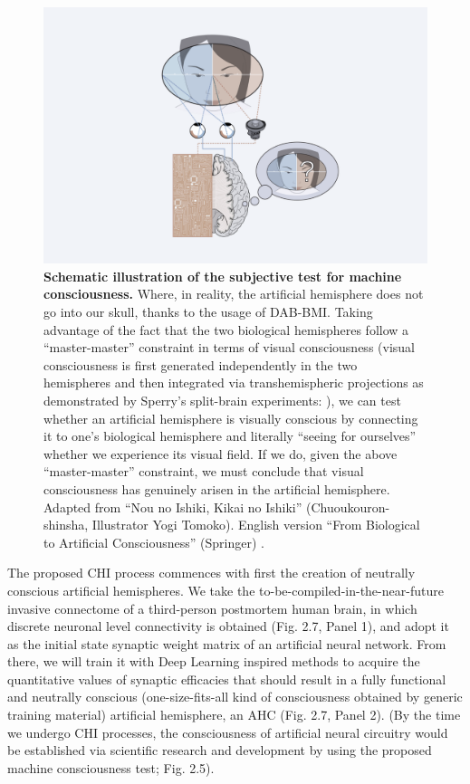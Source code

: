 \documentclass[10pt]{article}
\begin{document}
\begin{sloppypar}
  \begin{figure}[ht!]
    \centering
    \includegraphics[width=\textwidth]{figures/masa-approach-2.png}
    \caption[CHI: Schematic illustration of the subjective test for machine consciousness]{\textbf{Schematic illustration of the subjective test for machine consciousness.} Where, in reality, the artificial hemisphere does not go into our skull, thanks to the usage of DAB-BMI. Taking advantage of the fact that the two biological hemispheres follow a “master-master” constraint in terms of visual consciousness (visual consciousness is first generated independently in the two hemispheres and then integrated via transhemispheric projections as demonstrated by Sperry’s split-brain experiments: \cite{gazzaniga_functional_1962}), we can test whether an artificial hemisphere is visually conscious by connecting it to one’s biological hemisphere and literally “seeing for ourselves” whether we experience its visual field. If we do, given the above “master-master” constraint, we must conclude that visual consciousness has genuinely arisen in the artificial hemisphere. Adapted from “Nou no Ishiki, Kikai no Ishiki” (Chuoukouron-shinsha, Illustrator Yogi Tomoko). English version “From Biological to Artificial Consciousness” (Springer) \citep{watanabe_biological_2022}.}
    \label{fig:masa-approach-2}
  \end{figure}

  The proposed CHI process commences with first the creation of neutrally conscious artificial hemispheres. We take the to-be-compiled-in-the-near-future invasive connectome of a third-person postmortem human brain, in which discrete neuronal level connectivity is obtained (Fig. 2.7, Panel 1), and adopt it as the initial state synaptic weight matrix of an artificial neural network. From there, we will train it with Deep Learning inspired methods to acquire the quantitative values of synaptic efficacies that should result in a fully functional and neutrally conscious (one-size-fits-all kind of consciousness obtained by generic training material) artificial hemisphere, an AHC (Fig. 2.7, Panel 2). (By the time we undergo CHI processes, the consciousness of artificial neural circuitry would be established via scientific research and development by using the proposed machine consciousness test; Fig. 2.5).


\end{sloppypar}
\end{document}

